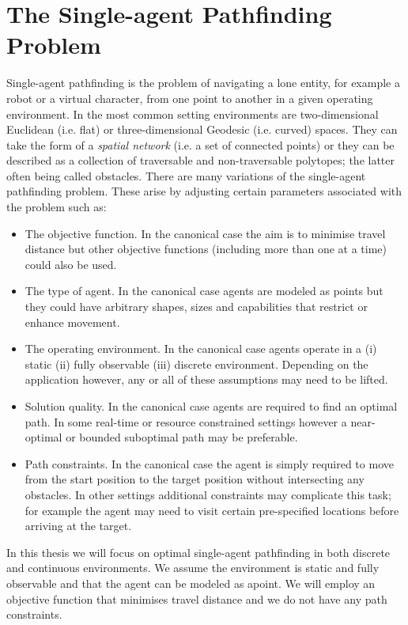 \section{The Single-agent Pathfinding Problem}
\label{cha::lit::problem}
Single-agent pathfinding is the problem of navigating a lone entity, for example
a robot or a virtual character, from one point to another in a given operating 
environment.  In the most common setting environments are two-dimensional
Euclidean (i.e.  flat) or three-dimensional Geodesic (i.e.  curved) spaces. They
can take the form of a \emph{spatial network} (i.e. a set of connected points)
or they can be described as a collection of traversable and non-traversable
polytopes; the latter often being called obstacles.  There are many variations
of the single-agent pathfinding problem. These arise by adjusting certain
parameters associated with the problem such as:
\begin{itemize}
\item The objective function. In the canonical case the aim is to minimise
travel distance but other objective functions (including more than one at a
time) could also be used.
\item The type of agent. In the canonical case agents are modeled as points
but they could have arbitrary shapes, sizes and capabilities that 
restrict or enhance movement. %
\item The operating environment. In the canonical case agents operate in a 
(i) static (ii) fully observable (iii) discrete environment. 
Depending on the application however, any or all of these assumptions may need 
to be lifted.
\item Solution quality. In the canonical case agents are required to find 
an optimal path.
In some real-time or resource constrained settings however a near-optimal 
or bounded suboptimal path may be preferable.
\item Path constraints. In the canonical case  the agent is simply required 
to move from the start position to the target position without intersecting
any obstacles. In other settings additional constraints may complicate this
task; for example the agent may need to visit certain pre-specified locations 
before arriving at the target.
\end{itemize}


In this thesis we will focus on optimal single-agent pathfinding 
in both discrete and continuous environments. We assume the environment is
static and fully observable and that the agent can be modeled as apoint.
We will employ an objective function that minimises travel distance and 
we do not have any path constraints.

